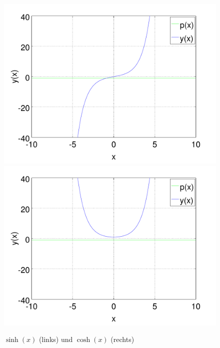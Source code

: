 \begin{figure}
	\includegraphics[width=0.51\hsize]{./wellen/images/basicfunctions/sinh.pdf}
	\includegraphics[width=0.51\hsize]{./wellen/images/basicfunctions/cosh.pdf}
	\caption{$\sinh(x)$ (links) und $\cosh(x)$ (rechts)}
	\label{fig:wellen:sinh-cosh}
\end{figure}